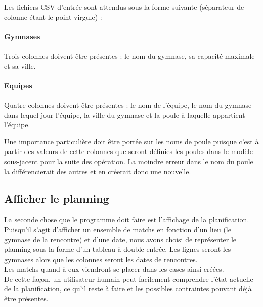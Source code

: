 \documentclass[final, noposter]{polytech/polytech}
\begin{document}
			Les fichiers CSV d'entrée sont attendus sous la forme suivante (séparateur de colonne étant le point virgule) :

			\paragraph{Gymnases}
				Trois colonnes doivent être présentes : le nom du gymnase, sa capacité maximale et sa ville.
				

			\paragraph{Equipes}
				Quatre colonnes doivent être présentes : le nom de l'équipe, le nom du gymnase dans lequel jour l'équipe, la ville du gymnase et la poule à laquelle appartient l'équipe.
				

				Une importance particulière doit être portée sur les noms de poule puisque c'est à partir des valeurs de cette colonnes que seront définies les poules dans le modèle sous-jacent pour la suite des opération. La moindre erreur dans le nom du poule la différencierait des autres et en créerait donc une nouvelle.

		\subsection{Afficher le planning}
			La seconde chose que le programme doit faire est l'affichage de la planification. \\
			Puisqu'il s'agit d'afficher un ensemble de matchs en fonction d'un lieu (le gymnase de la rencontre) et d'une date, nous avons choisi de représenter le planning sous la forme d'un tableau à double entrée. Les lignes seront les gymnases alors que les colonnes seront les dates de rencontres. \\
			Les matchs quand à eux viendront se placer dans les cases ainsi créées. \\
			De cette façon, un utilisateur humain peut facilement comprendre l'état actuelle de la planification, ce qu'il reste à faire et les possibles contraintes pouvant déjà être présentes.
\end{document}
